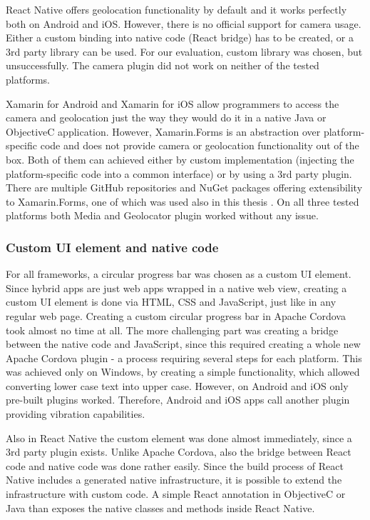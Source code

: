 \documentclass[english,master,public,dept460,male,cpdeclaration,oneside]{diploma}
\begin{document}
React Native offers geolocation functionality by default and it works perfectly both on Android and iOS. However, there is no official support for camera usage. Either a custom binding into native code (React bridge) has to be created, or a 3rd party library can be used. For our evaluation, custom library \cite{reactNativeCamera} was chosen, but unsuccessfully. The camera plugin did not work on neither of the tested platforms.

Xamarin for Android and Xamarin for iOS allow programmers to access the camera and geolocation just the way they would do it in a native Java or ObjectiveC application. However, Xamarin.Forms is an abstraction over platform-specific code and does not provide camera or geolocation functionality out of the box. Both of them can achieved either by custom implementation (injecting the platform-specific code into a common interface) or by using a 3rd party plugin. There are multiple GitHub repositories and NuGet packages offering extensibility to Xamarin.Forms, one of which was used also in this thesis \cite{xamarinPlugins}. On all three tested platforms both Media and Geolocator plugin worked without any issue. 

\subsubsection{Custom UI element and native code}
For all frameworks, a circular progress bar was chosen as a custom UI element. Since hybrid apps are just web apps wrapped in a native web view, creating a custom UI element is done via HTML, CSS and JavaScript, just like in any regular web page. Creating a custom circular progress bar in Apache Cordova took almost no time at all. 
The more challenging part was creating a bridge between the native code and JavaScript, since this required creating a whole new Apache Cordova plugin - a process requiring several steps for each platform. This was achieved only on Windows, by creating a simple functionality, which allowed converting lower case text into upper case. However, on Android and iOS only pre-built plugins worked. Therefore, Android and iOS apps call another plugin providing vibration capabilities.

Also in React Native the custom element was done almost immediately, since a 3rd party plugin exists. Unlike Apache Cordova, also the bridge between React code and native code was done rather easily. Since the build process of React Native includes a generated native infrastructure, it is possible to extend the infrastructure with custom code. A simple React annotation in ObjectiveC or Java than exposes the native classes and methods inside React Native.
\end{document}
